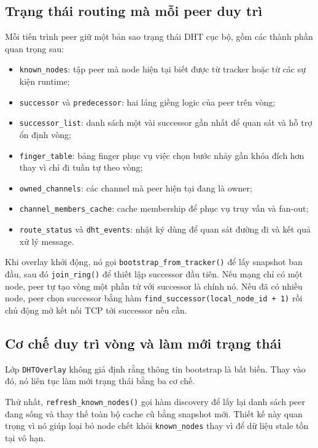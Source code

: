 \subsection{Trạng thái routing mà mỗi peer duy trì}
Mỗi tiến trình peer giữ một bản sao trạng thái DHT cục bộ, gồm các thành phần quan trọng sau:
\begin{itemize}[leftmargin=2em]
    \item \texttt{known\_nodes}: tập peer mà node hiện tại biết được từ tracker hoặc từ các sự kiện runtime;
    \item \texttt{successor} và \texttt{predecessor}: hai láng giềng logic của peer trên vòng;
    \item \texttt{successor\_list}: danh sách một vài successor gần nhất để quan sát và hỗ trợ ổn định vòng;
    \item \texttt{finger\_table}: bảng finger phục vụ việc chọn bước nhảy gần khóa đích hơn thay vì chỉ đi tuần tự theo vòng;
    \item \texttt{owned\_channels}: các channel mà peer hiện tại đang là owner;
    \item \texttt{channel\_members\_cache}: cache membership để phục vụ truy vấn và fan-out;
    \item \texttt{route\_status} và \texttt{dht\_events}: nhật ký dùng để quan sát đường đi và kết quả xử lý message.
\end{itemize}

Khi overlay khởi động, nó gọi \texttt{bootstrap\_from\_tracker()} để lấy snapshot ban đầu, sau đó \texttt{join\_ring()} để thiết lập successor đầu tiên. Nếu mạng chỉ có một node, peer tự tạo vòng một phần tử với successor là chính nó. Nếu đã có nhiều node, peer chọn successor bằng hàm \texttt{find\_successor(local\_node\_id + 1)} rồi chủ động mở kết nối TCP tới successor nếu cần.

\subsection{Cơ chế duy trì vòng và làm mới trạng thái}
Lớp \texttt{DHTOverlay} không giả định rằng thông tin bootstrap là bất biến. Thay vào đó, nó liên tục làm mới trạng thái bằng ba cơ chế.

Thứ nhất, \texttt{refresh\_known\_nodes()} gọi hàm discovery để lấy lại danh sách peer đang sống và thay thế toàn bộ cache cũ bằng snapshot mới. Thiết kế này quan trọng vì nó giúp loại bỏ node chết khỏi \texttt{known\_nodes} thay vì để dữ liệu stale tồn tại vô hạn.

